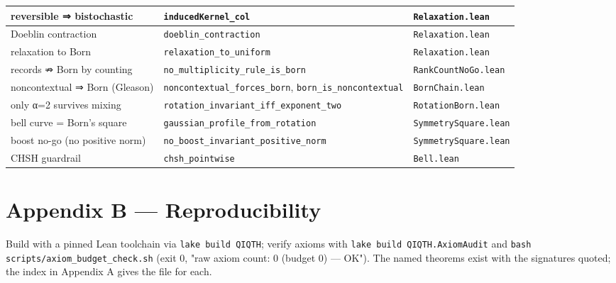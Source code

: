 \documentclass[11pt,a4paper]{article}
\begin{document}
\begin{center}
\begin{tabularx}{\linewidth}{|Y|Y|Y|}
\hline
reversible ⇒ bistochastic & \texttt{inducedKernel\_col} & \texttt{Relaxation.lean} \\
\hline
Doeblin contraction & \texttt{doeblin\_contraction} & \texttt{Relaxation.lean} \\
\hline
relaxation to Born & \texttt{relaxation\_to\_uniform} & \texttt{Relaxation.lean} \\
\hline
records ⇏ Born by counting & \texttt{no\_multiplicity\_rule\_is\_born} & \texttt{RankCountNoGo.lean} \\
\hline
noncontextual ⇒ Born (Gleason) & \texttt{noncontextual\_forces\_born}, \texttt{born\_is\_noncontextual} & \texttt{BornChain.lean} \\
\hline
only α=2 survives mixing & \texttt{rotation\_invariant\_iff\_exponent\_two} & \texttt{RotationBorn.lean} \\
\hline
bell curve = Born's square & \texttt{gaussian\_profile\_from\_rotation} & \texttt{SymmetrySquare.lean} \\
\hline
boost no-go (no positive norm) & \texttt{no\_boost\_invariant\_positive\_norm} & \texttt{SymmetrySquare.lean} \\
\hline
CHSH guardrail & \texttt{chsh\_pointwise} & \texttt{Bell.lean} \\
\hline
\end{tabularx}
\end{center}

\section{Appendix B — Reproducibility}

Build with a pinned Lean toolchain via \texttt{lake build QIQTH}; verify axioms with
\texttt{lake build QIQTH.AxiomAudit} and \texttt{bash scripts/axiom\_budget\_check.sh} (exit $0$, "raw axiom count: 0
(budget 0) — OK"). The named theorems exist with the signatures quoted; the index in Appendix A gives the
file for each.
\end{document}
